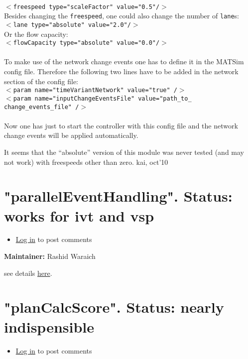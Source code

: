 \documentclass[a4paper,11pt]{report}
\begin{document}
\\   
\texttt{$<$freespeed type="scaleFactor" value="0.5"/$>$}
\\  Besides changing the 
\texttt{freespeed}, one could also change the number of 
\texttt{lane}s:
\\   
\texttt{$<$lane type="absolute" value="2.0"/$>$}
\\  Or the flow capacity:
\\   
\texttt{$<$flowCapacity type="absolute" value="0.0"/$>$}
\\
\\  To make use of the network change events one has to define it in the  MATSim config file. Therefore the following two lines have to be added  in the network section of the config file:
\\
\texttt{$<$param name="timeVariantNetwork" value="true" /$>$
\\  $<$param name="inputChangeEventsFile" value="path\_to\_ change\_events\_file" /$>$}
\\
\\  Now one has just to start the controller with this config file and the network change events will be applied automatically.

It  seems that the ``absolute'' version of this module was never tested (and  may not work) with freespeeds other than zero. kai, oct'10



\vfill\eject
\section{"parallelEventHandling". Status: works for ivt and vsp}
\begin{itemize}
	\item \href{http://www.matsim.org/user/login?destination=comment/reply/460%23comment-form}{Log in} to post comments
\end{itemize}

\textbf{Maintainer:} Rashid Waraich

see details \href{http://matsim.org/node/238}{here}.



\vfill\eject
\section{"planCalcScore". Status: nearly indispensible}
\begin{itemize}
	\item \href{http://www.matsim.org/user/login?destination=comment/reply/396%23comment-form}{Log in} to post comments
\end{itemize}
\end{document}
